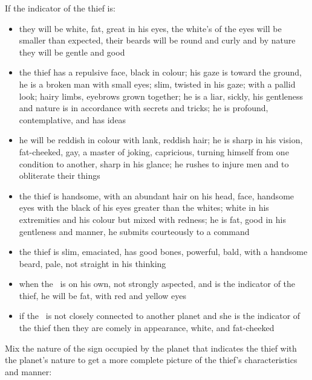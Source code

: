 If the indicator of the thief is:
\begin{itemize}[topsep=0em,itemsep=0em]
\item[\Jupiter] they will be white, fat, great in his eyes, the white's of the eyes will be smaller than expected, their beards will be round and curly and by nature they will be gentle and good
\item[\Saturn] the thief has a  repulsive face, black in colour; his gaze is toward the ground, he is a broken man with small eyes; slim, twisted in his gaze; with a pallid look; hairy limbs, eyebrows grown together; he is a liar, sickly, his gentleness and nature is in accordance with secrets and tricks; he is profound, contemplative, and has ideas
\item[\Mars] he will be reddish in colour with lank, reddish hair; he is sharp in his vision, fat-cheeked, gay, a master of joking, capricious, turning himself from one condition to another, sharp in his glance; he rushes to injure men and to obliterate their things
\item[\Venus]  the thief is handsome, with an abundant hair on his head, face, handsome eyes with the black of his eyes greater than the whites; white in his extremities and his colour but mixed with redness; he is fat, good in his gentleness and manner, he submits courteously to a command
\item[\Mercury] the thief is slim, emaciated, has good bones, powerful, bald, with a handsome beard, pale, not straight in his thinking
\item[\Sun] when the \Sun\, is on his own, not strongly aspected, and is the indicator of the thief, he will be fat, with red and yellow eyes
\item[\Moon] if the \Moon\, is not closely connected to another planet and she is the indicator of the thief then they are comely in appearance, white, and fat-cheeked
\end{itemize}

Mix the nature of the sign occupied by the planet that indicates the thief with the planet's nature to get a more complete picture of the thief's characteristics and manner:

